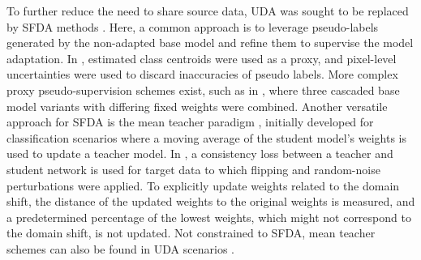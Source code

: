         To further reduce the need to share source data, UDA was sought to be replaced by SFDA methods \cite{yang2022source,wen2023source,chen2021source}.
        Here, a common approach is to leverage pseudo-labels generated by the non-adapted base model and refine them to supervise the model adaptation. In \cite{chen2021source}, estimated class centroids were used as a proxy, and pixel-level uncertainties were used to discard inaccuracies of pseudo labels.
        More complex proxy pseudo-supervision schemes exist, such as in \cite{yang2022source}, where three cascaded base model variants with differing fixed weights were combined.
        Another versatile approach for SFDA is the mean teacher paradigm \cite{tarvainen2017mean}, initially developed for classification scenarios where a moving average of the student model’s weights is used to update a teacher model. In \cite{wen2023source}, a consistency loss between a teacher and student network is used for target data to which flipping and random-noise perturbations were applied. To explicitly update weights related to the domain shift, the distance of the updated weights to the original weights is measured, and a predetermined percentage of the lowest weights, which might not correspond to the domain shift, is not updated. Not constrained to SFDA, mean teacher schemes can also be found in UDA scenarios \cite{perone2019unsupervised}.
